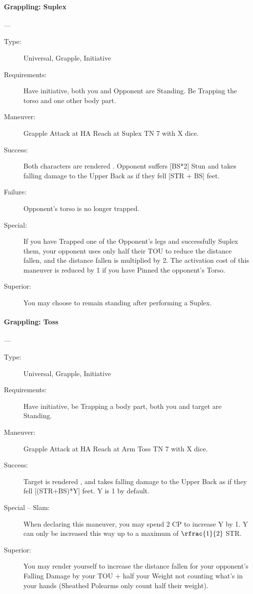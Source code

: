 \paragraph{Grappling: Suplex \large} \label{man:grappling-suplex}
---\quad {\large [X+3]}
\vspace{-10pt} \begin{description}
\item [Type:] Universal, Grapple, Initiative
\item [Requirements:] Have initiative, both you and Opponent are Standing. Be
  Trapping 
the torso and one other body part. 
\item [Maneuver:] Grapple Attack at HA Reach at Suplex TN 7 with X dice.
\item [Success:] Both characters are rendered . Opponent suffers [BS*2]
  Stun and 
takes falling damage to the Upper Back as if they fell [STR + BS] feet. 
\item [Failure:] Opponent’s torso is no longer trapped.
\item [Special:] If you have Trapped one of the Opponent's legs and successfully
  Suplex them, your opponent uses only half their TOU to reduce the distance
  fallen, and the distance fallen is multiplied by 2. The activation cost of
  this maneuver is reduced by 1 if you have Pinned the opponent’s Torso. 
\item [ Superior: ] You may choose to remain standing after performing a Suplex.
\end{description}

\paragraph{Grappling: Toss \large} \label{man:grappling-toss}
---\quad {\large [X+2]}
\vspace{-10pt} \begin{description}
\item [Type:] Universal, Grapple, Initiative
\item [Requirements:] Have initiative, be Trapping a body part, both you and
  target are Standing. 
\item [Maneuver:] Grapple Attack at HA Reach at Arm Toss TN 7 with X dice.
\item [Success:] Target is rendered , and takes falling damage to the Upper
  Back as if they fell [(STR+BS)*Y] feet.  
 Y is 1 by default.
\item [Special -- Slam:]
 When declaring this maneuver, you may spend 2 CP to increase Y by 1. Y can only
 be increased this way up to a maximum of $\rfrac{1}{2}$ STR.
 \item [Superior:] You may render yourself  to increase the distance fallen
   for your opponent’s Falling Damage by your TOU + half your Weight not
   counting what's in your hands (Sheathed Polearms only count half their
   weight).    
\end{description}

